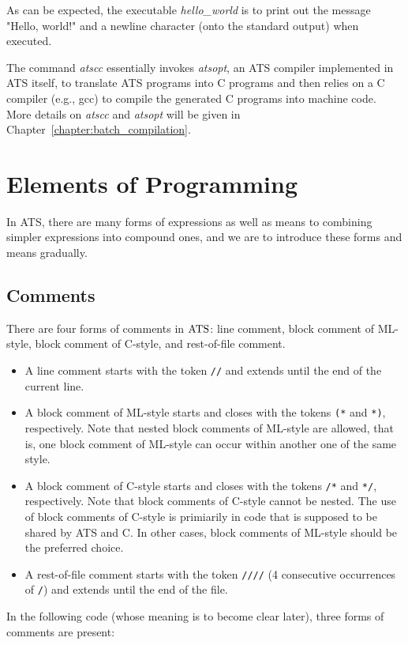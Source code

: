 As can be expected, the executable {\it hello\_world} is to print out the
message "Hello, world!" and a newline character (onto the standard output)
when executed.

The command {\it atscc} essentially invokes {\it atsopt}, an ATS compiler
implemented in ATS itself, to translate ATS programs into C programs and
then relies on a C compiler (e.g., gcc) to compile the generated C programs
into machine code. More details on {\it atscc} and {\it atsopt} will be
given in Chapter~\ref{chapter:batch_compilation}.


\section{Elements of Programming}

In ATS, there are many forms of expressions as well as means to combining
simpler expressions into compound ones, and we are to introduce these forms
and means gradually.

\subsection{Comments}
There are four forms of comments in $\mbox{\rm ATS}$: line comment, block comment of
ML-style, block comment of C-style, and rest-of-file comment.
\begin{itemize}
\item
A line comment starts with the token \texttt{//} and extends until the end
of the current line.

\item
A block comment of ML-style starts and closes with the tokens \texttt{(*}
and \texttt{*)}, respectively. Note that nested block comments of ML-style
are allowed, that is, one block comment of ML-style can occur within
another one of the same style.

\item
A block comment of C-style starts and closes with the tokens \texttt{/*} and
\texttt{*/}, respectively. Note that block comments of C-style cannot be
nested.  The use of block comments of C-style is primiarily in code that is
supposed to be shared by ATS and C. In other cases, block comments of
ML-style should be the preferred choice.

\item
A rest-of-file comment starts with the token \texttt{////} (4 consecutive
occurrences of \texttt{/}) and extends until the end of the file.
\end{itemize}
In the following code (whose meaning is to become clear later),
three forms of comments are present:


